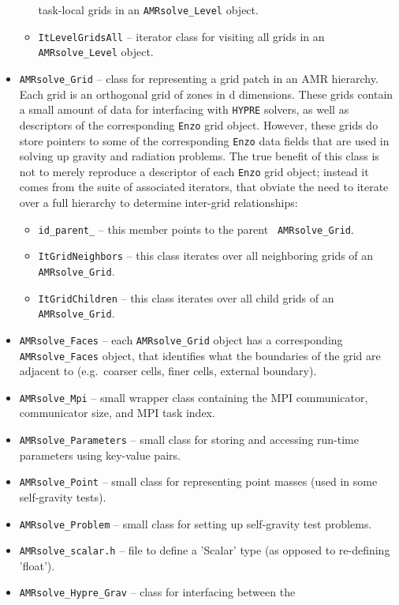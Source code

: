 \documentclass[letterpaper,10pt]{article}
\renewcommand{\(}{\left(}
\renewcommand{\)}{\right)}
\newcommand{\enzo}{{\tt Enzo} }
\newcommand{\hypre}{{\tt HYPRE} }
\begin{document}
\begin{itemize}
\begin{itemize}
    task-local grids in an {\tt AMRsolve\_Level} object.
  \item {\tt ItLevelGridsAll} -- iterator class for visiting all
    grids in an {\tt AMRsolve\_Level} object.
  \end{itemize}
\item {\tt AMRsolve\_Grid} -- class for representing a grid patch in
  an AMR hierarchy.  Each grid is an orthogonal grid of zones in d
  dimensions.  These grids contain a small amount of data for
  interfacing with \hypre solvers, as well as descriptors of the
  corresponding \enzo grid object.  However, these grids do store
  pointers to some of the corresponding \enzo data fields that are
  used in solving up gravity and radiation problems.  The true benefit
  of this class is not to merely reproduce a descriptor of each \enzo
  grid object; instead it comes from the suite of associated
  iterators, that obviate the need to iterate over a full hierarchy to
  determine inter-grid relationships:
  \begin{itemize}
  \item {\tt id\_parent\_} -- this member points to the parent {\tt
    AMRsolve\_Grid}.
  \item {\tt ItGridNeighbors} -- this class iterates over all
    neighboring grids of an {\tt AMRsolve\_Grid}.
  \item {\tt ItGridChildren} -- this class iterates over all child
    grids of an {\tt AMRsolve\_Grid}.
  \end{itemize}
\item {\tt AMRsolve\_Faces} -- each {\tt AMRsolve\_Grid} object has a
  corresponding {\tt AMRsolve\_Faces} object, that identifies what the
  boundaries of the grid are adjacent to (e.g.~coarser cells, finer
  cells, external boundary).
\item {\tt AMRsolve\_Mpi} -- small wrapper class containing the MPI
  communicator, communicator size, and MPI task index.
\item {\tt AMRsolve\_Parameters} -- small class for storing and
  accessing run-time parameters using key-value pairs.
\item {\tt AMRsolve\_Point} -- small class for representing point
  masses (used in some self-gravity tests).
\item {\tt AMRsolve\_Problem} -- small class for setting up
  self-gravity test problems.
\item {\tt AMRsolve\_scalar.h} -- file to define a 'Scalar' type (as
  opposed to re-defining 'float').
\item {\tt AMRsolve\_Hypre\_Grav} -- class for interfacing between the

\end{itemize}
\end{document}
